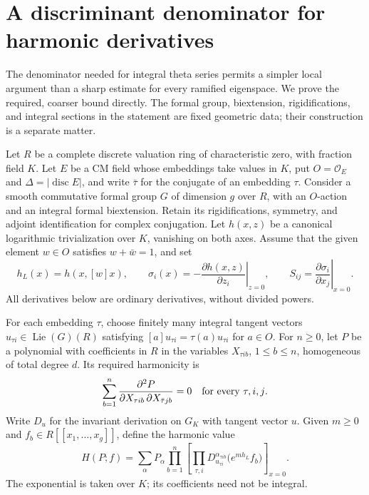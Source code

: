 \section{A discriminant denominator for harmonic derivatives}
\label{sec:geometry-discriminant-clearing}

The denominator needed for integral theta series permits a simpler local
argument than a sharp estimate for every ramified eigenspace.  We prove
the required, coarser bound directly.  The formal group, biextension,
rigidifications, and integral sections in the statement are fixed geometric
data; their construction is a separate matter.

Let $R$ be a complete discrete valuation ring of characteristic zero, with
fraction field $K$.  Let $E$ be a CM field whose embeddings take values in
$K$, put $O=\mathcal O_E$ and $\Delta=|\operatorname{disc} E|$, and write
$\bar\tau$ for the conjugate of an embedding $\tau$.  Consider a smooth
commutative formal group $G$ of dimension $g$ over $R$, with an $O$-action
and an integral formal biextension.  Retain its rigidifications, symmetry,
and adjoint identification for complex conjugation.  Let $h(x,z)$ be a
canonical logarithmic trivialization over $K$, vanishing on both axes.
Assume that the given element $w\in O$ satisfies $w+\bar w=1$, and set
\[
 h_L(x)=h(x,[w]x),\qquad
 \sigma_i(x)=-\left.\frac{\partial h(x,z)}{\partial z_i}\right|_{z=0},
 \qquad S_{ij}=\left.\frac{\partial\sigma_i}{\partial x_j}\right|_{x=0}.
\]
All derivatives below are ordinary derivatives, without divided powers.

For each embedding $\tau$, choose finitely many integral tangent vectors
$u_{\tau i}\in\operatorname{Lie}(G)(R)$ satisfying
$[a]u_{\tau i}=\tau(a)u_{\tau i}$ for $a\in O$.
For $n\geq0$, let $P$ be a polynomial with coefficients in $R$ in the
variables $X_{\tau i b}$, $1\leq b\leq n$, homogeneous of total degree $d$.
Its required harmonicity is
\begin{equation}\label{eq:discriminant-harmonic}
 \sum_{b=1}^n
 \frac{\partial^2P}{\partial X_{\tau i b}\,
                 \partial X_{\bar\tau j b}}=0
 \quad\hbox{for every $\tau,i,j$.}
\end{equation}
Write $D_u$ for the invariant derivation on $G_K$ with tangent vector $u$.
Given $m\geq0$ and $f_b\in R[[x_1,\ldots,x_g]]$, define the harmonic value
\begin{equation}\label{eq:discriminant-harmonic-value}
 H(P;f)=\sum_\alpha P_\alpha
   \prod_{b=1}^n
    \left[\prod_{\tau,i}D_{u_{\tau i}}^{\alpha_{\tau i b}}
                  \bigl(e^{m h_L}f_b\bigr)\right]_{x=0}.
\end{equation}
The exponential is taken over $K$; its coefficients need not be integral.


